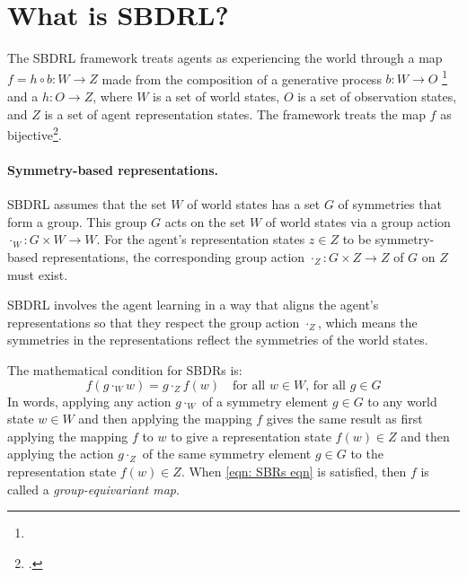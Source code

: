 \section{What is SBDRL?}

The SBDRL framework treats agents as experiencing the world through a map $f = h \circ b: W \to Z$ made from the composition of a generative process $b: W \to O$ 
\footnote{
} and a $h: O \to Z$, where $W$ is a set of world states, $O$ is a set of observation states, and $Z$ is a set of agent representation states.
The framework treats the map $f$ as bijective\footnote{.}.

\paragraph{Symmetry-based representations.}
SBDRL assumes that the set $W$ of world states has a set $G$ of symmetries that form a group.
This group $G$ acts on the set $W$ of world states via a group action $\cdot_{W}: G \times W \to W$.
For the agent's representation states $z \in Z$ to be symmetry-based representations, the corresponding group action $\cdot_{Z}: G \times Z \to Z$ of $G$ on $Z$ must exist.

SBDRL involves the agent learning in a way that aligns the agent's representations so that they respect the group action $\cdot_{Z}$, which means the symmetries in the representations reflect the symmetries of the world states.

The mathematical condition for SBDRs is:
\begin{equation}\label{eqn: SBRs eqn}
	f(g \cdot_{W} w) = g \cdot_{Z} f(w) \quad \text{for all $w\in W$, for all $g \in G$}
\end{equation}
In words, applying any action $g \cdot_{W}$ of a symmetry element $g \in G$ to any world state $w \in W$ and then applying the mapping $f$ gives the same result as first applying the mapping $f$ to $w$ to give a representation state $f(w) \in Z$ and then applying the action $g \cdot_Z$ of the same symmetry element $g \in G$ to the representation state $f(w) \in Z$.
When \cref{eqn: SBRs eqn} is satisfied, then $f$ is called a \emph{group-equivariant map}.

